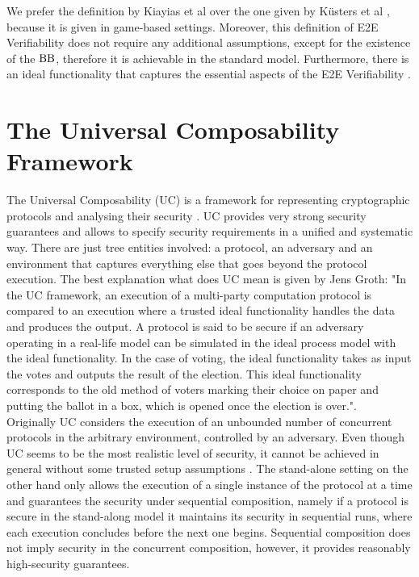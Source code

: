  We prefer the definition by Kiayias et al over the one given by K\"{u}sters et al \cite{Kusters2010}, because it is given in game-based settings. Moreover, this definition of E2E Verifiability does not require any additional assumptions, except for the existence of the $\operatorname{BB}$, therefore it is achievable in the standard model. Furthermore, there is an ideal functionality that captures the essential aspects of the E2E Verifiability \cite{idfunc}.  
 
 \section{The Universal Composability Framework}
 \label{uc}
The Universal Composability (UC) is a framework for representing cryptographic protocols and analysing their security \cite{Canetti2001}. UC provides very  strong security guarantees and allows to specify security requirements in a unified and systematic way. There are just tree entities involved: a protocol, an adversary and an environment that captures everything else that goes beyond the protocol execution. The best explanation what does UC mean is given by Jens Groth: "In the UC framework, an execution of a multi-party computation protocol is compared to an execution where a trusted ideal functionality handles the data and produces the output. A protocol is said to be secure if an adversary operating in a real-life model can be simulated in the ideal process model with the ideal functionality. In the case of voting, the ideal functionality takes as input the votes and outputs the result of the election. This ideal functionality corresponds to the old method of voters marking their choice on paper and putting the ballot in a box, which is opened once the election is over."\cite{Groth2004}.\\

Originally UC considers the execution of an unbounded number of concurrent protocols in the arbitrary environment, controlled by an adversary. Even though UC seems to be the most realistic level of security, it cannot be achieved in general without some trusted setup assumptions \cite{Lin2009}. The stand-alone setting on the other hand only allows the execution of a single instance of the protocol at a time and guarantees the security under sequential composition, namely if a protocol is secure in the stand-along model it maintains its security in sequential runs, where each execution concludes before the next one begins.  Sequential composition does not imply security in the concurrent composition, however, it provides reasonably high-security guarantees.\\ 

